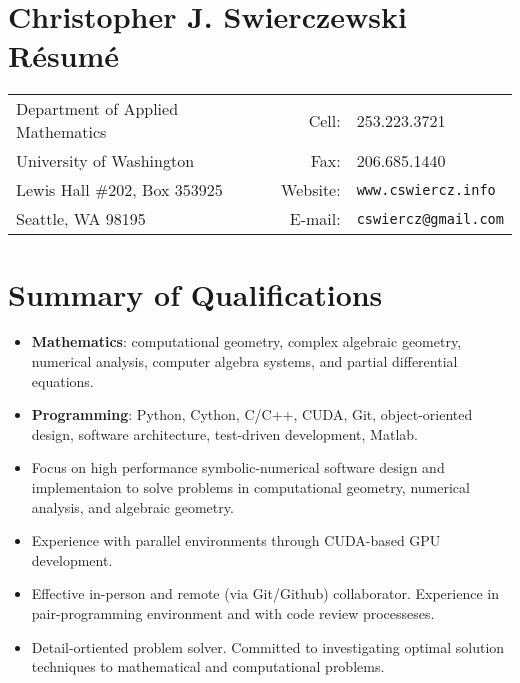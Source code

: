 \documentclass{article}
\begin{document}
\section*{Christopher J. Swierczewski \hspace{5.9cm} R\'esum\'e}

\begin{tabular}{lrl}
  Department of Applied Mathematics \hspace{5cm} & Cell:    & 253.223.3721 \\
  University of Washington          & Fax:         & 206.685.1440            \\
  Lewis Hall \#202, Box 353925      & Website:     & \tt www.cswiercz.info   \\
  Seattle, WA 98195                 & E-mail:      & \tt cswiercz@gmail.com
\end{tabular}

\section*{Summary of Qualifications}

\begin{itemize}
  \setlength{\itemsep}{0pt}
  \item {\bf Mathematics}: computational geometry, complex algebraic geometry,
    numerical analysis, computer algebra systems, and partial differential
    equations.
  \item {\bf Programming}: Python, Cython, C/C++, CUDA, Git, object-oriented
    design, software architecture, test-driven development, Matlab.
  \item Focus on high performance symbolic-numerical software design and
    implementaion to solve problems in computational geometry, numerical
    analysis, and algebraic geometry.
  \item Experience with parallel environments through CUDA-based GPU
    development.
  \item Effective in-person and remote (via Git/Github) collaborator. Experience
    in pair-programming environment and with code review processeses.
  \item Detail-ortiented problem solver. Committed to investigating optimal
    solution techniques to mathematical and computational problems.
\end{itemize}
\end{document}
